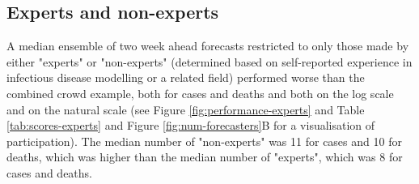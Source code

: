 \documentclass[10pt,a4paper,twocolumn]{article}
\begin{document}

\subsection*{Experts and non-experts}


A median ensemble of two week ahead forecasts restricted to only those made by either "experts" or "non-experts" (determined based on self-reported experience in infectious disease modelling or a related field) performed worse than the combined crowd example, both for cases and deaths and both on the log scale and on the natural scale (see Figure \ref{fig:performance-experts} and Table \ref{tab:scores-experts} and Figure \ref{fig:num-forecasters}B for a visualisation of participation). The median number of "non-experts" was 11 for cases and 10 for deaths, which was higher than the median number of "experts", which was 8 for cases and deaths. 
\end{document}
